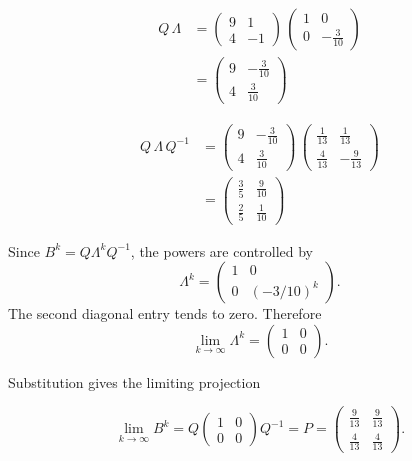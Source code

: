 \documentclass[11pt]{article}
\begin{document}
\[\begin{aligned}Q\,\Lambda &= \begin{pmatrix}9 & 1 \\ 4 & -1\end{pmatrix}\,\begin{pmatrix}1 & 0 \\ 0 & -\frac{3}{10}\end{pmatrix} \\
&= \begin{pmatrix}9 & -\frac{3}{10} \\ 4 & \frac{3}{10}\end{pmatrix}\end{aligned}\]

\[\begin{aligned}Q\,\Lambda\,Q^{-1} &= \begin{pmatrix}9 & -\frac{3}{10} \\ 4 & \frac{3}{10}\end{pmatrix}\,\begin{pmatrix}\frac{1}{13} & \frac{1}{13} \\ \frac{4}{13} & -\frac{9}{13}\end{pmatrix} \\
&= \begin{pmatrix}\frac{3}{5} & \frac{9}{10} \\ \frac{2}{5} & \frac{1}{10}\end{pmatrix}\end{aligned}\]

Since \(B^k=Q\Lambda^kQ^{-1}\), the powers are controlled by
\[\Lambda^k=\begin{pmatrix}1&0\\0&(-3/10)^k\end{pmatrix}.\]
The second diagonal entry tends to zero. Therefore
\[\lim_{k\to\infty}\Lambda^k=\begin{pmatrix}1&0\\0&0\end{pmatrix}.\]

Substitution gives the limiting projection

\[\lim_{k\to\infty}B^k=Q\begin{pmatrix}1&0\\0&0\end{pmatrix}Q^{-1}=P=\begin{pmatrix}\frac{9}{13}&\frac{9}{13}\\[2pt]\frac{4}{13}&\frac{4}{13}\end{pmatrix}.\]
\end{document}
